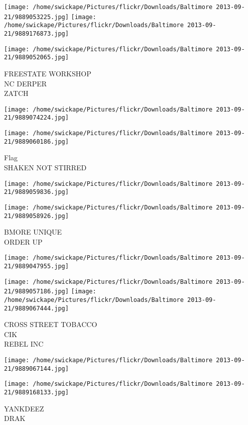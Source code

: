 \documentclass[10pt,letterpaper]{article}
\begin{document}
\texttt{[image: /home/swickape/Pictures/flickr/Downloads/Baltimore 2013-09-21/9889053225.jpg]}
\texttt{[image: /home/swickape/Pictures/flickr/Downloads/Baltimore 2013-09-21/9889176873.jpg]}

\texttt{[image: /home/swickape/Pictures/flickr/Downloads/Baltimore 2013-09-21/9889052065.jpg]}

FREESTATE WORKSHOP\\
NC DERPER\\
ZATCH
\pagebreak

\texttt{[image: /home/swickape/Pictures/flickr/Downloads/Baltimore 2013-09-21/9889074224.jpg]}

\vspace{0.25in}
\texttt{[image: /home/swickape/Pictures/flickr/Downloads/Baltimore 2013-09-21/9889060186.jpg]}

Flag\\
SHAKEN NOT STIRRED
\pagebreak

\texttt{[image: /home/swickape/Pictures/flickr/Downloads/Baltimore 2013-09-21/9889059836.jpg]}

\vspace{0.25in}
\texttt{[image: /home/swickape/Pictures/flickr/Downloads/Baltimore 2013-09-21/9889058926.jpg]}

BMORE UNIQUE\\
ORDER UP
\pagebreak

\texttt{[image: /home/swickape/Pictures/flickr/Downloads/Baltimore 2013-09-21/9889047955.jpg]}

\vspace{0.25in}
\texttt{[image: /home/swickape/Pictures/flickr/Downloads/Baltimore 2013-09-21/9889057186.jpg]}
\texttt{[image: /home/swickape/Pictures/flickr/Downloads/Baltimore 2013-09-21/9889067444.jpg]}

CROSS STREET TOBACCO\\
CIK\\
REBEL INC
\pagebreak

\texttt{[image: /home/swickape/Pictures/flickr/Downloads/Baltimore 2013-09-21/9889067144.jpg]}

\vspace{0.25in}
\texttt{[image: /home/swickape/Pictures/flickr/Downloads/Baltimore 2013-09-21/9889168133.jpg]}

YANKDEEZ\\
DRAK
\pagebreak
\end{document}

